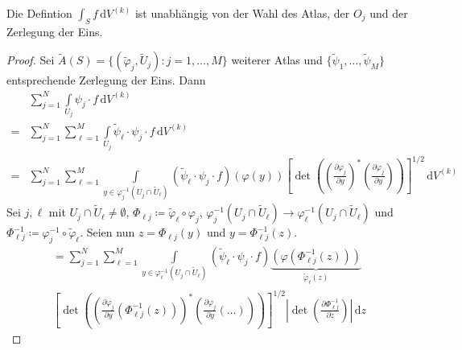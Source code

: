 \begin{theorem}[Satz] \label{thm:11.6}
  Die Defintion $\int_S f \, \mathrm{d}V^{(k)}$ ist unabhängig von der Wahl des Atlas, der $O_j$ und der Zerlegung der Eins.
  
  \begin{proof}
    Sei $\widetilde{A}(S) = \{ (\widetilde{\varphi}_j, \widetilde{U}_j ) : j=1,\ldots,M \}$ weiterer Atlas und $\{ \widetilde{\psi}_1 ,\ldots, \widetilde{\psi}_M \}$ entsprechende Zerlegung der Eins. Dann
    \begin{align*}
      & \sum\limits_{j=1}^{N} \int\limits_{U_j} \psi_j \cdot f \, \mathrm{d}V^{(k)} \\
      =& \sum\limits_{j=1}^{N} \sum\limits_{\ell=1}^{M} \int\limits_{U_j} \widetilde{\psi}_\ell \cdot \psi_j \cdot f \, \mathrm{d}V^{(k)} \\
      =& \sum\limits_{j=1}^{N} \sum\limits_{\ell=1}^{M} \int\limits_{y \in \varphi_j^{-1}(U_j \cap \widetilde{U}_\ell)} \left(\widetilde{\psi}_\ell \cdot \psi_j \cdot f\right) (\varphi(y)) \left[ \det \left( \left( \frac{\partial \varphi_j}{\partial y} \right)^* \left( \frac{\partial \varphi_j}{\partial y} \right) \right) \right]^{1/2} \, \mathrm{d}V^{(k)}
    \end{align*}
    Sei $j,\ell$ mit $U_j \cap \widetilde{U}_\ell \neq \emptyset$, $\Phi_{\ell j} \coloneq \widetilde{\varphi}_\ell \circ \varphi_j$, $\varphi_j^{-1}(U_j \cap \widetilde{U}_\ell) \to \varphi_\ell^{-1}(U_j \cap \widetilde{U}_\ell)$ und $\Phi_{\ell j}^{-1} \coloneq \varphi_j^{-1} \circ \widetilde{\varphi}_\ell$. Seien nun $z = \Phi_{\ell j}(y)$ und $y = \Phi_{\ell j}^{-1}(z)$.
    \begin{multline*}
      = \sum\limits_{j=1}^{N} \sum\limits_{\ell=1}^{M} \int\limits_{y \in \varphi_\ell^{-1}(U_j \cap \widetilde{U}_\ell)} 
      \left(\widetilde{\psi}_\ell \cdot \psi_j \cdot f\right)
      \underbrace{(\varphi(\Phi_{\ell j}^{-1}(z)))}_{\widetilde{\varphi}_\ell(z)}
      \\
      \left[ \det \left( \left( \frac{\partial \varphi_j}{\partial y}(\Phi_{\ell j}^{-1}(z)) \right)^* \left( \frac{\partial \varphi_j}{\partial y}(\ldots) \right) \right) \right]^{1/2}
      \left| \det\left( \frac{\partial \Phi_{\ell j}^{-1}}{\partial z} \right) \right|
      \, \mathrm{d}z
    \end{multline*}
    

\end{proof}
\end{theorem}
